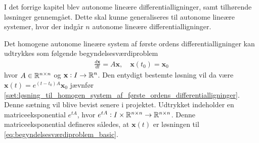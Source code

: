 I det forrige kapitel blev autonome lineære differentialligninger, samt tilhørende løsninger gennemgået. Dette skal kunne generaliseres til autonome lineære systemer, hvor der indgår $n$ autonome lineære differentialligninger.  

Det homogene autonome lineære system af første ordens differentialligninger kan udtrykkes som følgende begyndelsesværdiproblem
%
\begin{align} \label{eq:begyndelsesværdiproblem_basic}
    \frac{d\textbf{x}}{dt}=A\textbf{x}, \quad \textbf{x}(t_0)=\textbf{x}_0
\end{align}
%
hvor $A \in \mathbb{R}^{n \times n}$ og $\textbf{x}: I \to \mathbb{R}^n$. Den entydigt bestemte løsning vil da være $\textbf{x}(t)=e^{(t-t_0)A}\textbf{x}_0$ jævnfør \autoref{sæt:løsning_til_homogen_system_af_første_ordens_differentialligninger}. Denne sætning vil blive bevist senere i projektet. Udtrykket indeholder en matriceeksponential $e^{tA}$, hvor $e^{tA}: I\times\mathbb{R}^{n\times n} \to \mathbb{R}^{n \times n}$. Denne matriceeksponential defineres således, at $\textbf{x}(t)$ er løsningen til \eqref{eq:begyndelsesværdiproblem_basic}.
%



